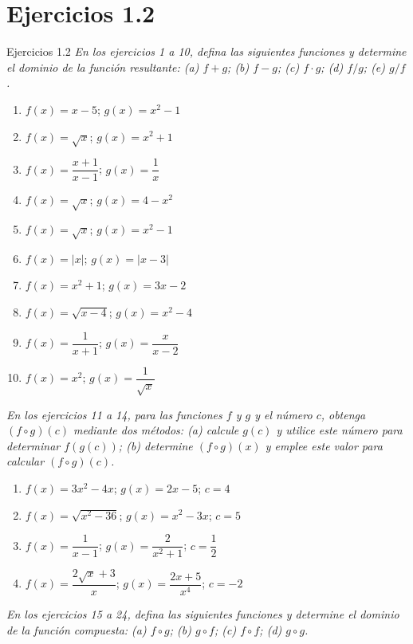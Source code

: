 \documentclass[aspectratio=169,10pt]{beamer}
\begin{document}
\section{Ejercicios 1.2}
\begin{frame}{Ejercicios 1.2}
\textit{En los ejercicios 1 a 10, defina las siguientes funciones y determine el dominio de la función resultante: (a) $f+g$; (b) $f-g$; (c) $f\cdot g$; (d) $f/g$; (e) $g/f$.}

\begin{enumerate}
\item $f(x)=x-5$; $g(x)=x^2-1$
\item $f(x)=\sqrt{x}$; $g(x)=x^2+1$
\item $f(x)=\dfrac{x+1}{x-1}$; $g(x)=\dfrac1x$
\item $f(x)=\sqrt{x}$; $g(x)=4-x^2$
\item $f(x)=\sqrt{x}$; $g(x)=x^2-1$
\item $f(x)=|x|$; $g(x)=|x-3|$
\item $f(x)=x^2+1$; $g(x)=3x-2$
\item $f(x)=\sqrt{x-4}$; $g(x)=x^2-4$
\item $f(x)=\dfrac1{x+1}$; $g(x)=\dfrac{x}{x-2}$
\item $f(x)=x^2$; $g(x)=\dfrac1{\sqrt{x}}$
\end{enumerate}

\textit{En los ejercicios 11 a 14, para las funciones $f$ y $g$ y el número $c$, obtenga $(f\circ g)(c)$ mediante dos métodos: (a) calcule $g(c)$ y utilice este número para determinar $f(g(c))$; (b) determine $(f\circ g)(x)$ y emplee este valor para calcular $(f\circ g)(c)$.}

\begin{enumerate}
\item $f(x)=3x^2-4x$; $g(x)=2x-5$; $c=4$
\item $f(x)=\sqrt{x^2-36}$; $g(x)=x^2-3x$; $c=5$
\item $f(x)=\dfrac1{x-1}$; $g(x)=\dfrac2{x^2+1}$; $c=\dfrac12$
\item $f(x)=\dfrac{2\sqrt{x}+3}{x}$; $g(x)=\dfrac{2x+5}{x^4}$; $c=-2$
\end{enumerate}

\textit{En los ejercicios 15 a 24, defina las siguientes funciones y determine el dominio de la función compuesta: (a) $f\circ g$; (b) $g\circ f$; (c) $f\circ f$; (d) $g\circ g$.}


\end{frame}
\end{document}
